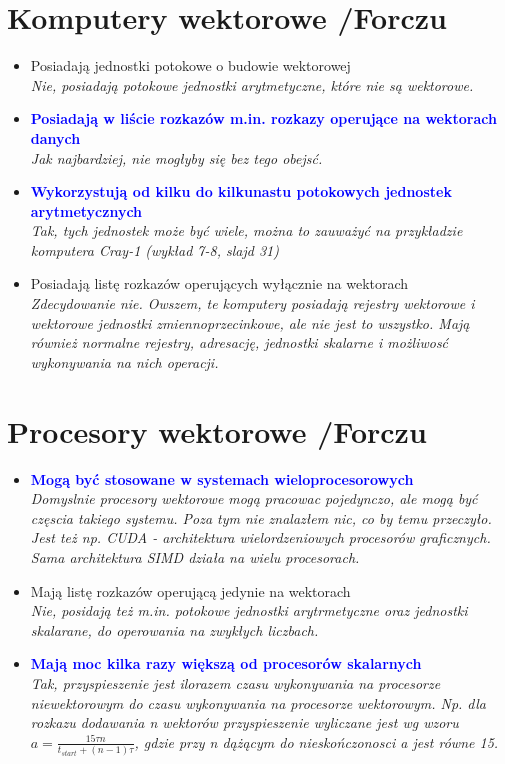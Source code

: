 \section{Komputery wektorowe  {\small /Forczu}}
	\begin{itemize}
    \item Posiadają jednostki potokowe o budowie wektorowej\\
    {\small \emph{Nie, posiadają potokowe jednostki arytmetyczne, które nie są wektorowe.}}
    \item \textcolor{Blue}{\textbf{Posiadają w liście rozkazów m.in. rozkazy operujące na wektorach danych}}\\
    {\small \emph{Jak najbardziej, nie mogłyby się bez tego obejsć.}}
    \item \textcolor{Blue}{\textbf{Wykorzystują od kilku do kilkunastu potokowych jednostek arytmetycznych}}\\
    {\small \emph{Tak, tych jednostek może być wiele, można to zauważyć na przykładzie komputera Cray-1 (wykład 7-8, slajd 31)}}
    \item Posiadają listę rozkazów operujących wyłącznie na wektorach\\
    {\small \emph{Zdecydowanie nie. Owszem, te komputery posiadają rejestry wektorowe i wektorowe jednostki zmiennoprzecinkowe, ale nie jest to wszystko. Mają również normalne rejestry, adresację, jednostki skalarne i możliwosć wykonywania na nich operacji.}}
    \end{itemize}

\section{Procesory wektorowe {\small /Forczu}}
	\begin{itemize}
    \item \textcolor{Blue}{\textbf{Mogą być stosowane w systemach wieloprocesorowych}}\\
    {\small \emph{Domyslnie procesory wektorowe mogą pracowac pojedynczo, ale mogą być częscia takiego systemu. Poza tym nie znalazłem nic, co by temu przeczyło. Jest też np. CUDA - architektura wielordzeniowych procesorów graficznych. Sama architektura SIMD działa na wielu procesorach.}}
    \item Mają listę rozkazów operującą jedynie na wektorach\\
    {\small \emph{Nie, posidają też m.in. potokowe jednostki arytrmetyczne oraz jednostki skalarane, do operowania na zwykłych liczbach.}}
    \item \textcolor{Blue}{\textbf{Mają moc kilka razy większą od procesorów skalarnych}}\\
    {\small \emph{Tak, przyspieszenie jest ilorazem czasu wykonywania na procesorze niewektorowym do czasu wykonywania na procesorze wektorowym. Np. dla rozkazu dodawania \emph{n} wektorów przyspieszenie wyliczane jest wg wzoru $ a=\frac{15\tau n}{t_{start}+(n-1)\tau} $, gdzie przy \emph{n} dążącym do nieskończonosci \emph{a} jest równe 15.}}
    \end{itemize}

